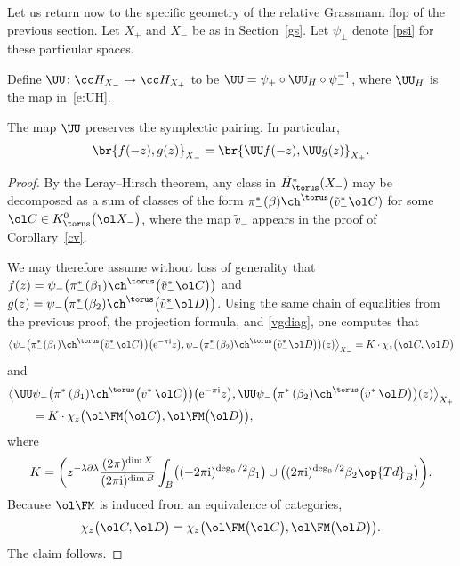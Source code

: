 Let us return now to the specific geometry of the relative Grassmann flop of the previous section. Let $X_+$ and $X_-$ be as in Section~\ref{gs}. Let $\psi_{\pm}$ denote \eqref{psi} for these particular spaces.
\begin{Definition}\label{d:UH}
Define $\UU\colon \cc H_{X_-} \to \cc H_{X_+}$ to be
$\UU = \psi_{+} \circ \UU_H \circ \psi_{-}^{-1}$,
 where $\UU_H$ is the map in~\eqref{e:UH}.
\end{Definition}

\begin{Corollary}\label{c:symp}
The map $\UU$ preserves the symplectic pairing. In particular,
\[
\br{f(-z), g(z)}_{X_-} = \br{\UU f(-z), \UU g(z)}_{X_+}.
\]
\end{Corollary}

\begin{proof}
By the Leray--Hirsch theorem, any class in $\hat H^*_\torus(X_-)$ may be decomposed as a sum of classes of the form $\pi_-^*(\beta) \ch^\torus(\tilde v_-^* \ol C)$ for some $\ol C \in K^0_\torus\bigl(\ol X_-\bigr)$, where the map $\tilde v_-$ appears in the proof of Corollary~\ref{cv}.

We may therefore assume without loss of generality that
$f(z) =\psi_-\bigl( \pi_-^*(\beta_1)\ch^\torus\bigl(\tilde v_-^* \ol C\bigr)\bigr)$ and
$g(z) = \psi_-\bigl(\pi_-^*(\beta_2) \ch^\torus\bigl(\tilde v_-^* \ol D\bigr)\bigr)$.
Using the same chain of equalities from the previous proof, the projection formula, and \eqref{vgdiag}, one computes that
\begin{align*}
 \bigl\langle\psi_-\bigl( \pi_-^*(\beta_1)\ch^\torus\bigl(\tilde v_-^* \ol C\bigr)\bigr)\bigl( {\rm e}^{-\pi {\rm i}} z\bigr),\psi_-\bigl(\pi_-^*(\beta_2) \ch^\torus\bigl(\tilde v_-^* \ol D\bigr)\bigr)(z)\bigr\rangle_{X_-} = K \cdot \chi_z\bigl( \ol C, \ol D\bigr)\end{align*}
and
\begin{align*}
 & \bigl\langle \UU\psi_- \bigl( \pi_-^*(\beta_1)\ch^\torus\bigl(\tilde v_-^* \ol C\bigr)\bigr)\bigl( {\rm e}^{-\pi {\rm i}} z\bigr), \UU\psi_-\bigl(\pi_-^*(\beta_2) \ch^\torus\bigl(\tilde v_-^* \ol D\bigr)\bigr)(z)\bigr\rangle_{X_+}\\&\qquad{} =K \cdot \chi_z\bigl(\ol \FM \bigl(\ol C\bigr), \ol \FM\bigl( \ol D\bigr)\bigr),
 \end{align*}
where
\[
K = \biggl( z^{- \lambda \partial \lambda } \frac{(2 \pi)^{\dim X}}{(2 \pi {\rm i})^{\dim B}} \int_B \bigl((-2\pi {\rm i})^{\deg_0/2} \beta_1\bigr) \cup \bigl((2\pi {\rm i})^{\deg_0/2}\beta_2 \op{Td}_B\bigr) \biggr).
\]
Because $\ol \FM$ is induced from an equivalence of categories,
\[
\chi_z\bigl( \ol C, \ol D\bigr) = \chi_z\bigl(\ol \FM \bigl(\ol C\bigr), \ol \FM\bigl( \ol D\bigr)\bigr).
\]
The claim follows.
\end{proof}

